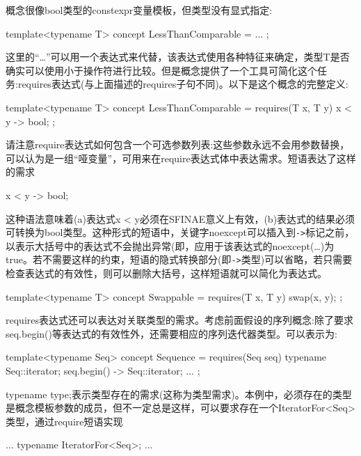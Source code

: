 概念很像bool类型的constexpr变量模板，但类型没有显式指定:

\begin{cpp}
template<typename T> concept LessThanComparable = ... ;
\end{cpp}

这里的“…”可以用一个表达式来代替，该表达式使用各种特征来确定，类型T是否确实可以使用小于操作符进行比较。但是概念提供了一个工具可简化这个任务:requires表达式(与上面描述的requires子句不同)。以下是这个概念的完整定义:

\begin{cpp}
template<typename T>
concept LessThanComparable = requires(T x, T y) {
	{ x < y } -> bool;
};
\end{cpp}

请注意require表达式如何包含一个可选参数列表:这些参数永远不会用参数替换，可以认为是一组“哑变量”，可用来在require表达式体中表达需求。短语表达了这样的需求

\begin{cpp}
{ x < y } -> bool;
\end{cpp}

这种语法意味着(a)表达式x < y必须在SFINAE意义上有效，(b)表达式的结果必须可转换为bool类型。这种形式的短语中，关键字noexcept可以插入到\texttt{->}标记之前，以表示大括号中的表达式不会抛出异常(即，应用于该表达式的noexcept(…)为true。若不需要这样的约束，短语的隐式转换部分(即\texttt{->}类型)可以省略，若只需要检查表达式的有效性，则可以删除大括号，这样短语就可以简化为表达式。

\begin{cpp}
template<typename T>
concept Swappable = requires(T x, T y) {
	swap(x, y);
};
\end{cpp}

requires表达式还可以表达对关联类型的需求。考虑前面假设的序列概念:除了要求seq.begin()等表达式的有效性外，还需要相应的序列迭代器类型。可以表示为:

\begin{cpp}
template<typename Seq>
concept Sequence = requires(Seq seq) {
	typename Seq::iterator;
	{ seq.begin() } -> Seq::iterator;
	...
};
\end{cpp}

typename type;表示类型存在的需求(这称为类型需求)。本例中，必须存在的类型是概念模板参数的成员，但不一定总是这样，可以要求存在一个IteratorFor<Seq>类型，通过require短语实现

\begin{cpp}
...
typename IteratorFor<Seq>;
...
\end{cpp}

